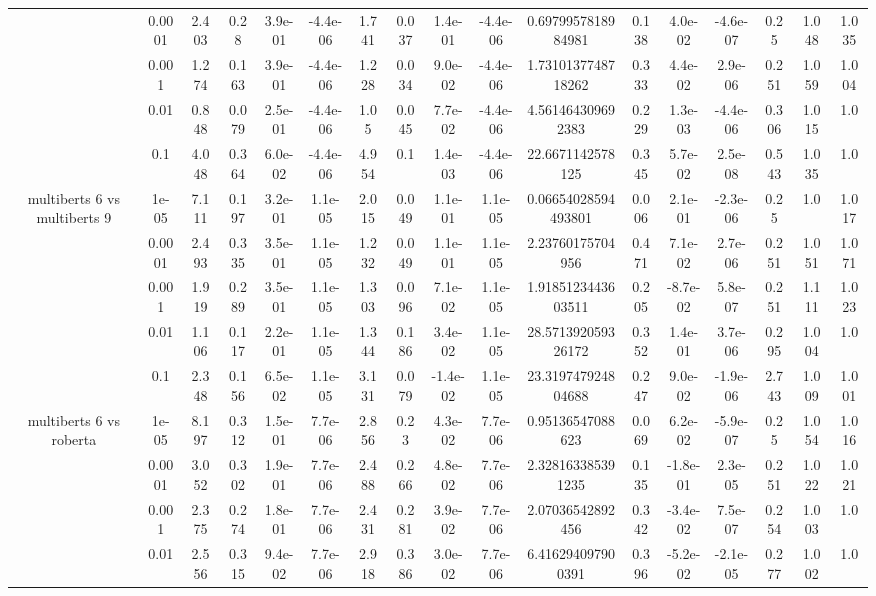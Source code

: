 \begin{tabular}{|c|c|c|c|c|c|c|c|c|c|c|c|c|c|c|c|c|}
 & 0.0001 & 2.403 & 0.28 & 3.9e-01 & -4.4e-06 & 1.741 & 0.037 & 1.4e-01 & -4.4e-06 & 0.6979957818984981 & 0.138 & 4.0e-02 & -4.6e-07 & 0.25 & 1.048 & 1.035 \\
 & 0.001 & 1.274 & 0.163 & 3.9e-01 & -4.4e-06 & 1.228 & 0.034 & 9.0e-02 & -4.4e-06 & 1.7310137748718262 & 0.333 & 4.4e-02 & 2.9e-06 & 0.251 & 1.059 & 1.004 \\
 & 0.01 & 0.848 & 0.079 & 2.5e-01 & -4.4e-06 & 1.05 & 0.045 & 7.7e-02 & -4.4e-06 & 4.561464309692383 & 0.229 & 1.3e-03 & -4.4e-06 & 0.306 & 1.015 & 1.0 \\
 & 0.1 & 4.048 & 0.364 & 6.0e-02 & -4.4e-06 & 4.954 & 0.1 & 1.4e-03 & -4.4e-06 & 22.6671142578125 & 0.345 & 5.7e-02 & 2.5e-08 & 0.543 & 1.035 & 1.0 \\
\hline
\multirow{5}{*}{multiberts 6 vs multiberts 9} & 1e-05 & 7.111 & 0.197 & 3.2e-01 & 1.1e-05 & 2.015 & 0.049 & 1.1e-01 & 1.1e-05 & 0.06654028594493801 & 0.006 & 2.1e-01 & -2.3e-06 & 0.25 & 1.0 & 1.017 \\
 & 0.0001 & 2.493 & 0.335 & 3.5e-01 & 1.1e-05 & 1.232 & 0.049 & 1.1e-01 & 1.1e-05 & 2.23760175704956 & 0.471 & 7.1e-02 & 2.7e-06 & 0.251 & 1.051 & 1.071 \\
 & 0.001 & 1.919 & 0.289 & 3.5e-01 & 1.1e-05 & 1.303 & 0.096 & 7.1e-02 & 1.1e-05 & 1.9185123443603511 & 0.205 & -8.7e-02 & 5.8e-07 & 0.251 & 1.111 & 1.023 \\
 & 0.01 & 1.106 & 0.117 & 2.2e-01 & 1.1e-05 & 1.344 & 0.186 & 3.4e-02 & 1.1e-05 & 28.571392059326172 & 0.352 & 1.4e-01 & 3.7e-06 & 0.295 & 1.004 & 1.0 \\
 & 0.1 & 2.348 & 0.156 & 6.5e-02 & 1.1e-05 & 3.131 & 0.079 & -1.4e-02 & 1.1e-05 & 23.319747924804688 & 0.247 & 9.0e-02 & -1.9e-06 & 2.743 & 1.009 & 1.001 \\
\hline
\multirow{5}{*}{multiberts 6 vs roberta } & 1e-05 & 8.197 & 0.312 & 1.5e-01 & 7.7e-06 & 2.856 & 0.23 & 4.3e-02 & 7.7e-06 & 0.95136547088623 & 0.069 & 6.2e-02 & -5.9e-07 & 0.25 & 1.054 & 1.016 \\
 & 0.0001 & 3.052 & 0.302 & 1.9e-01 & 7.7e-06 & 2.488 & 0.266 & 4.8e-02 & 7.7e-06 & 2.328163385391235 & 0.135 & -1.8e-01 & 2.3e-05 & 0.251 & 1.022 & 1.021 \\
 & 0.001 & 2.375 & 0.274 & 1.8e-01 & 7.7e-06 & 2.431 & 0.281 & 3.9e-02 & 7.7e-06 & 2.07036542892456 & 0.342 & -3.4e-02 & 7.5e-07 & 0.254 & 1.003 & 1.0 \\
 & 0.01 & 2.556 & 0.315 & 9.4e-02 & 7.7e-06 & 2.918 & 0.386 & 3.0e-02 & 7.7e-06 & 6.416294097900391 & 0.396 & -5.2e-02 & -2.1e-05 & 0.277 & 1.002 & 1.0 \\

\end{tabular}

